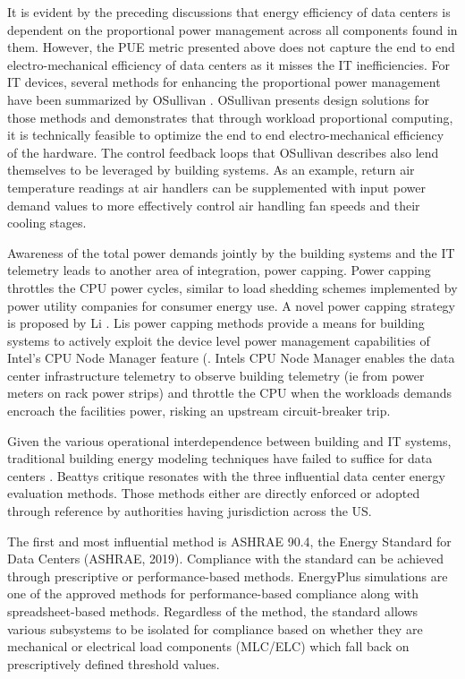 \documentclass[twocolumn, a4paper,10pt]{article}
\begin{document}
It is evident by the preceding discussions that energy efficiency of data centers is dependent on the proportional power management across all components found in them. However, the PUE metric presented above does not capture the end to end electro-mechanical efficiency of data centers as it misses the IT inefficiencies. For IT devices, several methods for enhancing the proportional power management have been summarized by O\textsc{}Sullivan \citep{osullivan15}. O\textsc{}Sullivan presents design solutions for those methods and demonstrates that through workload proportional computing, it is technically feasible to optimize the end to end electro-mechanical efficiency of the hardware. The control feedback loops that O\textsc{}Sullivan describes also lend themselves to be leveraged by building systems. As an example, return air temperature readings at air handlers can be supplemented with input power demand values to more effectively control air handling fan speeds and their cooling stages. 

Awareness of the total power demands jointly by the building system\textsc{}s and the IT telemetry leads to another area of integration, power capping. Power capping throttles the CPU power cycles, similar to load shedding schemes implemented by power utility companies for consumer energy use. A novel power capping strategy is proposed by Li \citep{Li18}. Li\textsc{}s power capping methods provide a means for building systems to actively exploit the device level power management capabilities of Intel’s CPU Node Manager feature (\citep{intel15}. Intel\textsc{}s CPU Node Manager enables the data center infrastructure telemetry to observe building telemetry (ie from power meters on rack power strips) and throttle the CPU when the workloads demands encroach the facilities power, risking an upstream circuit-breaker trip.

Given the various operational interdependence between building and IT systems, traditional building energy modeling techniques have failed to suffice for data centers \citep{Beatty15}. Beatty\textsc{}s critique resonates with the three influential data center energy evaluation methods. Those methods either are directly enforced or adopted through reference by authorities having jurisdiction across the US. 

The first and most influential method is ASHRAE 90.4, the Energy Standard for Data Centers (ASHRAE, 2019). Compliance with the standard can be achieved through prescriptive or performance-based methods. EnergyPlus simulations are one of the approved methods for performance-based compliance along with spreadsheet-based methods. Regardless of the method, the standard allows various subsystems to be isolated for compliance based on whether they are mechanical or electrical load components (MLC/ELC) which fall back on prescriptively defined threshold values.
\end{document}
